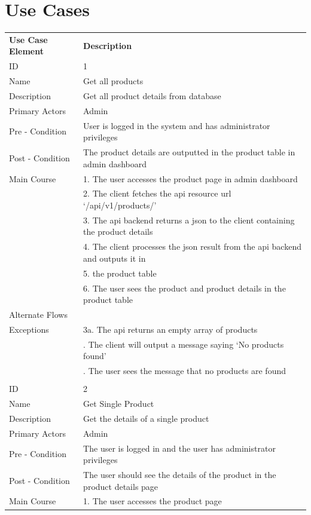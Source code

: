 \documentclass{report}
\begin{document}
\chapter{Use Cases}
\begin{tabular}{ l l }
\textbf{Use Case Element} & \textbf{Description} \\
ID 					& 1 \\
Name 				& Get all products \\
Description 			& Get all product details from database \\ 
Primary Actors 		& Admin \\
Pre - Condition 		& User is logged in the system and has administrator privileges \\ 
Post - Condition 	& The product details are outputted in the product table in admin dashboard \\ 
Main Course			& 1. The user accesses the product page in admin dashboard \\
 					& 2. The client fetches the api resource url ‘/api/v1/products/’ \\
 					& 3. The api backend returns a json to the client containing the product details \\ 
 					& 4. The client processes the json result from the api backend and outputs it in \\
 					& 5. the product table \\
 					& 6. The user sees the product and product details in the product table \\
Alternate Flows		& \\
Exceptions 			& 3a. The api returns an empty array of products\\ 
					& \qquad 1. The client will output a message saying ‘No products found’ \\
					& \qquad 2. The user sees the message that no products are found \\ \\
ID 					& 2 \\
Name 				& Get Single Product\\
Description 			& Get the details of a single product \\ 
Primary Actors 		& Admin\\
Pre - Condition 		& The user is logged in and the user has administrator privileges \\ 
Post - Condition 	& The user should see the details of the product in the product details page \\ 
Main Course			& 1. The user accesses the product page \\

\end{tabular}
\end{document}
